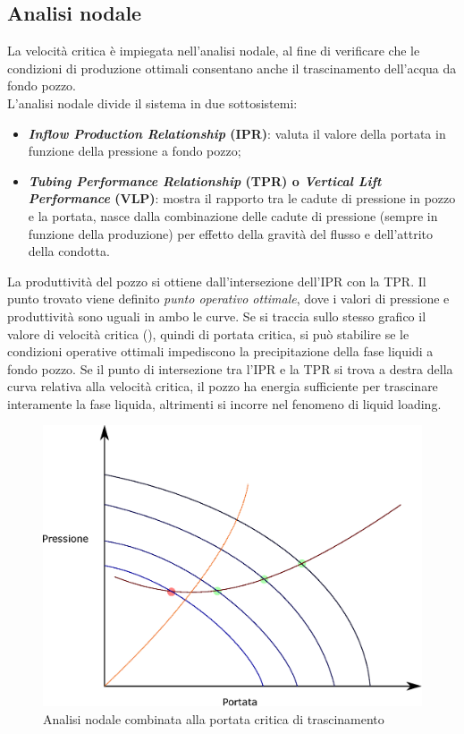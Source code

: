 \subsection{Analisi nodale}
La velocità critica è impiegata nell'analisi nodale, al fine di verificare che le condizioni di produzione ottimali consentano anche il trascinamento dell'acqua da fondo pozzo.\\
L'analisi nodale divide il sistema in due sottosistemi:
\begin{itemize}
    \item \textbf{\textit{Inflow Production Relationship} (IPR)}: valuta il valore della portata in funzione della pressione a fondo pozzo;
    \item \textbf{\textit{Tubing Performance Relationship} (TPR) o \textit{Vertical Lift Performance} (VLP)}: mostra il rapporto tra le cadute di pressione in pozzo e la portata, nasce dalla combinazione delle cadute di pressione (sempre in funzione della produzione) per effetto della gravità del flusso e dell'attrito della condotta.
\end{itemize}
La produttività del pozzo si ottiene dall'intersezione dell'IPR con la TPR. Il punto trovato viene definito \textit{punto operativo ottimale}, dove i valori di pressione e produttività sono uguali in ambo le curve. Se si traccia sullo stesso grafico il valore di velocità critica (), quindi di portata critica, si può stabilire se le condizioni operative ottimali impediscono la precipitazione della fase liquidi a fondo pozzo. Se il punto di intersezione tra l'IPR e la TPR si trova a destra della curva relativa alla velocità critica, il pozzo ha energia sufficiente per trascinare interamente la fase liquida, altrimenti si incorre nel fenomeno di liquid loading.

\begin{figure}[htbp]
    \centering
    \includegraphics[width=.5\textwidth]{fig/foamer/ipr-tpr.eps}
    \caption{Analisi nodale combinata alla portata critica di trascinamento}
    \label{fig:ipr-tpr}
\end{figure}


